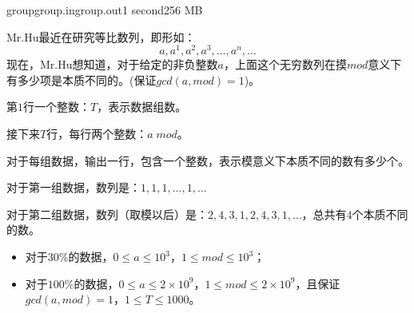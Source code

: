 \documentclass[11pt,a4paper,oneside]{article}
\begin{document}
\begin{problem}{group}{group.in}{group.out}{1 second}{256 MB}	
	
	Mr.Hu最近在研究等比数列，即形如：
	$$
		a, a^1, a^2, a^3, \dots, a^n, \dots
	$$
	现在，Mr.Hu想知道，对于给定的非负整数$a$，上面这个无穷数列在摸$mod$意义下有多少项是本质不同的。(保证$gcd(a,mod) = 1$)。
	
	\InputFile
	
	第$1$行一个整数：$T$，表示数据组数。
	
	接下来$T$行，每行两个整数：$a \; mod$。
	
	\OutputFile
	
	对于每组数据，输出一行，包含一个整数，表示模意义下本质不同的数有多少个。
	
	\Example
	
	\begin{example}
	\end{example}

	对于第一组数据，数列是：$1, 1, 1, \dots, 1, \dots$
	
	对于第二组数据，数列（取模以后）是：$2, 4, 3, 1, 2, 4, 3, 1, \dots$，总共有$4$个本质不同的数。
	
	\Note

	\begin{itemize}
		\item 对于$30\%$的数据，$0 \leq a \leq 10^3$，$1 \leq mod \leq 10^3$；
		\item 对于$100\%$的数据，$0 \leq a \leq 2 \times 10^9$，$1 \leq mod \leq 2 \times 10^9$，且保证$gcd(a,mod) = 1$，$1 \leq T \leq 1000$。
	\end{itemize}

\end{problem}
\end{document}
